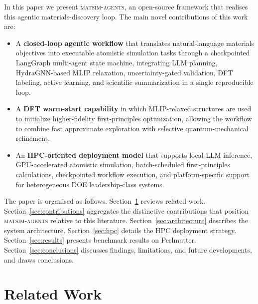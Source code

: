 \documentclass[conference]{IEEEtran}
\def\ac#1{#1}%
\def\acs#1{#1}%
\begin{document}
In this paper we present \textsc{matsim-agents}, an open-source framework that
realises this agentic materials-discovery loop. The main novel contributions of
this work are:

\begin{itemize}
\item A \textbf{closed-loop agentic workflow} that translates natural-language
  materials objectives into executable atomistic simulation tasks through a
  checkpointed LangGraph multi-agent state machine, integrating \ac{LLM} planning,
  HydraGNN-based \acs{MLIP} relaxation, uncertainty-gated validation, \acs{DFT} labeling,
  active learning, and scientific summarization in a single reproducible loop.
\item A \textbf{\acs{DFT} warm-start capability} in which \acs{MLIP}-relaxed structures are
  used to initialize higher-fidelity first-principles optimization, allowing the
  workflow to combine fast approximate exploration with selective
  quantum-mechanical refinement.
\item An \textbf{\acs{HPC}-oriented deployment model} that supports local \acs{LLM}
  inference, \acs{GPU}-accelerated atomistic simulation, batch-scheduled
  first-principles calculations, checkpointed workflow execution, and
  platform-specific support for heterogeneous \ac{DOE} leadership-class systems.
\end{itemize}

The paper is organised as follows. Section~\ref{sec:related} reviews related
work. Section~\ref{sec:contributions} aggregates the distinctive contributions
that position \textsc{matsim-agents} relative to this literature.
Section~\ref{sec:architecture} describes the system architecture.
Section~\ref{sec:hpc} details the \acs{HPC} deployment strategy.
Section~\ref{sec:results} presents benchmark results on Perlmutter.
Section~\ref{sec:conclusions} discusses findings, limitations, and future
developments, and draws conclusions.

\section{Related Work}
\label{sec:related}
\end{document}
